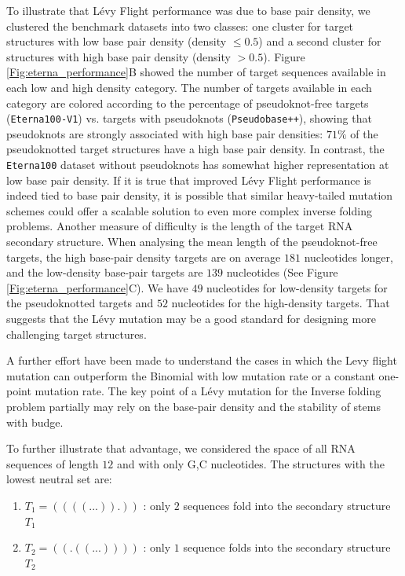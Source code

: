 To illustrate that Lévy Flight performance was due to base pair density, we clustered the benchmark datasets into two classes: one cluster for target structures with low base pair density (density $\leq 0.5$) and a second cluster for structures with high base pair density (density $> 0.5$). Figure \ref{Fig:eterna_performance}B showed the number of target sequences available in each low and high density category. The number of targets available in each category are colored according to the percentage of pseudoknot-free targets (\texttt{Eterna100-V1}) vs. targets with pseudoknots (\texttt{Pseudobase++}), showing that pseudoknots are strongly associated with high base pair densities: $71\%$ of the pseudoknotted target structures have a high base pair density.  In contrast, the \texttt{Eterna100} dataset without pseudoknots has somewhat higher representation at low base pair density. If it is true that improved Lévy Flight performance is indeed tied to base pair density, it is possible that similar heavy-tailed mutation schemes could offer a scalable solution to even more complex inverse folding problems. Another measure of difficulty is the length of the target RNA secondary structure. When analysing the mean length of the pseudoknot-free targets, the high base-pair density targets are on average $181$ nucleotides longer, and the low-density base-pair targets are $139$ nucleotides (See Figure \ref{Fig:eterna_performance}C). We have $49$ nucleotides for low-density targets for the pseudoknotted targets and $52$ nucleotides for the high-density targets. That suggests that the Lévy mutation may be a good standard for designing more challenging target structures.

A further effort have been made to understand the cases in which the Levy flight mutation can outperform the Binomial with low mutation rate or a constant one-point mutation rate. The key point of a Lévy mutation for the Inverse folding problem partially may rely on the base-pair density and the stability of stems with budge.  

To further illustrate that advantage, we considered the space of all RNA sequences of length  $12$ and with only G,C nucleotides. The structures with the lowest neutral set are: 

\begin{enumerate}
	\item $T_1= ((((...)).))$ : only $2$ sequences fold into the secondary structure $T_1$
	\item $T_2= ((.((...))))$ : only $1$ sequence folds into the secondary structure $T_2$
\end{enumerate}

